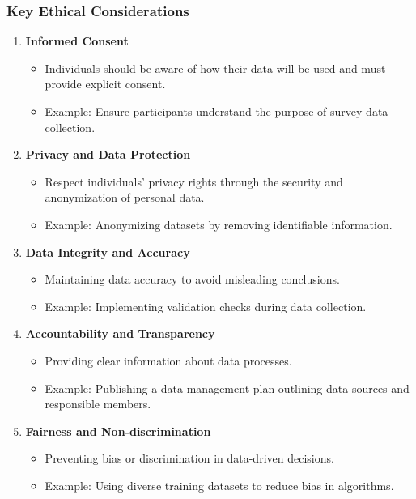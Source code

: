 \documentclass[aspectratio=169]{beamer}
\begin{document}
\begin{frame}[fragile]
    \frametitle{Key Ethical Considerations}
    \begin{enumerate}
        \item \textbf{Informed Consent}
        \begin{itemize}
            \item Individuals should be aware of how their data will be used and must provide explicit consent.
            \item Example: Ensure participants understand the purpose of survey data collection.
        \end{itemize}
        
        \item \textbf{Privacy and Data Protection}
        \begin{itemize}
            \item Respect individuals’ privacy rights through the security and anonymization of personal data.
            \item Example: Anonymizing datasets by removing identifiable information.
        \end{itemize}
        
        \item \textbf{Data Integrity and Accuracy}
        \begin{itemize}
            \item Maintaining data accuracy to avoid misleading conclusions.
            \item Example: Implementing validation checks during data collection.
        \end{itemize}

        \item \textbf{Accountability and Transparency}
        \begin{itemize}
            \item Providing clear information about data processes.
            \item Example: Publishing a data management plan outlining data sources and responsible members.
        \end{itemize}
        
        \item \textbf{Fairness and Non-discrimination}
        \begin{itemize}
            \item Preventing bias or discrimination in data-driven decisions.
            \item Example: Using diverse training datasets to reduce bias in algorithms.
        \end{itemize}
    \end{enumerate}
\end{frame}
\end{document}
